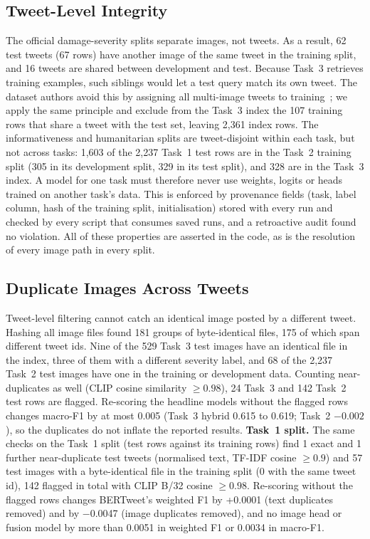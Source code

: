\documentclass[conference]{IEEEtran}
\begin{document}
\subsection{Tweet-Level Integrity}
\label{sec:data_integrity}
The official damage-severity splits separate images, not tweets. As a result, 62 test tweets (67 rows) have another image of the same tweet in the training split, and 16 tweets are shared between development and test. Because Task~3 retrieves training examples, such siblings would let a test query match its own tweet. The dataset authors avoid this by assigning all multi-image tweets to training~\cite{ofli2020}; we apply the same principle and exclude from the Task~3 index the 107 training rows that share a tweet with the test set, leaving 2,361 index rows. The informativeness and humanitarian splits are tweet-disjoint within each task, but not across tasks: 1,603 of the 2,237 Task~1 test rows are in the Task~2 training split (305 in its development split, 329 in its test split), and 328 are in the Task~3 index. A model for one task must therefore never use weights, logits or heads trained on another task's data. This is enforced by provenance fields (task, label column, hash of the training split, initialisation) stored with every run and checked by every script that consumes saved runs, and a retroactive audit found no violation. All of these properties are asserted in the code, as is the resolution of every image path in every split.

\subsection{Duplicate Images Across Tweets}
Tweet-level filtering cannot catch an identical image posted by a different tweet. Hashing all image files found 181 groups of byte-identical files, 175 of which span different tweet ids. Nine of the 529 Task~3 test images have an identical file in the index, three of them with a different severity label, and 68 of the 2,237 Task~2 test images have one in the training or development data. Counting near-duplicates as well (CLIP cosine similarity $\geq 0.98$), 24 Task~3 and 142 Task~2 test rows are flagged. Re-scoring the headline models without the flagged rows changes macro-F1 by at most 0.005 (Task~3 hybrid 0.615 to 0.619; Task~2 $-0.002$), so the duplicates do not inflate the reported results. \textbf{Task~1 split.} The same checks on the Task~1 split (test rows against its training rows) find 1 exact and 1 further near-duplicate test tweets (normalised text, TF-IDF cosine $\geq 0.9$) and 57 test images with a byte-identical file in the training split (0 with the same tweet id), 142 flagged in total with CLIP B/32 cosine $\geq 0.98$. Re-scoring without the flagged rows changes BERTweet's weighted F1 by +0.0001 (text duplicates removed) and by $-$0.0047 (image duplicates removed), and no image head or fusion model by more than 0.0051 in weighted F1 or 0.0034 in macro-F1.
\end{document}

